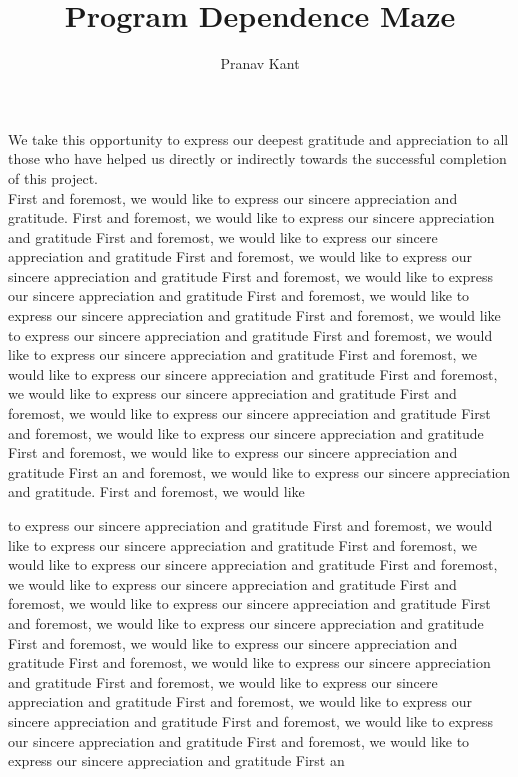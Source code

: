 \documentclass{nithreport}
\title{Program Dependence Maze}
\author{Pranav Kant}
\begin{document}
  
\maketitle
{}
\certificate


\begin{acknowledgments}
We take this opportunity to express our deepest gratitude and appreciation to all those who have helped us directly or indirectly towards the successful completion of this project.\\
First and foremost, we would like to express our sincere appreciation and gratitude. First and foremost, we would like to express our sincere appreciation and gratitude First and foremost, we would like to express our sincere appreciation and gratitude First and foremost, we would like to express our sincere appreciation and gratitude First and foremost, we would like to express our sincere appreciation and gratitude First and foremost, we would like to express our sincere appreciation and gratitude First and foremost, we would like to express our sincere appreciation and gratitude First and foremost, we would like to express our sincere appreciation and gratitude First and foremost, we would like to express our sincere appreciation and gratitude First and foremost, we would like to express our sincere appreciation and gratitude First and foremost, we would like to express our sincere appreciation and gratitude First and foremost, we would like to express our sincere appreciation and gratitude First and foremost, we would like to express our sincere appreciation and gratitude First an and foremost, we would like to express our sincere appreciation and gratitude. First and foremost, we would like

to express our sincere appreciation and gratitude First and foremost, we would like to express our sincere appreciation and gratitude First and foremost, we would like to express our sincere appreciation and gratitude First and foremost, we would like to express our sincere appreciation and gratitude First and foremost, we would like to express our sincere appreciation and gratitude First and foremost, we would like to express our sincere appreciation and gratitude First and foremost, we would like to express our sincere appreciation and gratitude First and foremost, we would like to express our sincere appreciation and gratitude First and foremost, we would like to express our sincere appreciation and gratitude First and foremost, we would like to express our sincere appreciation and gratitude First and foremost, we would like to express our sincere appreciation and gratitude First and foremost, we would like to express our sincere appreciation and gratitude First an

\end{acknowledgments}
\end{document}
